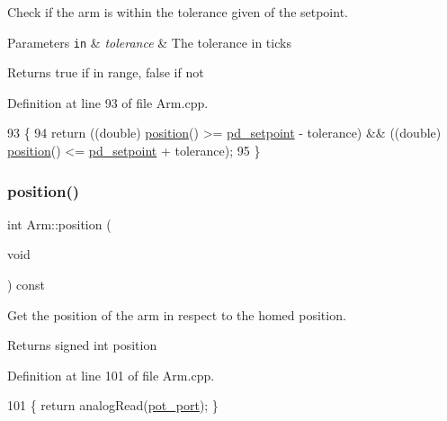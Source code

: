 Check if the arm is within the tolerance given of the setpoint. 


\begin{DoxyParams}[1]{Parameters}
\mbox{\tt in}  & {\em tolerance} & The tolerance in ticks \\
\hline
\end{DoxyParams}
\begin{DoxyReturn}{Returns}
true if in range, false if not 
\end{DoxyReturn}


Definition at line 93 of file Arm.\+cpp.


\begin{DoxyCode}
93                                        \{
94     \textcolor{keywordflow}{return} ((\textcolor{keywordtype}{double}) \hyperlink{class_arm_a2688295ef2029461e65723d1563f7a28}{position}() >= \hyperlink{class_arm_a1f4bd75360f1fa61330494569b08f4aa}{pd\_setpoint} - tolerance) && ((double) 
      \hyperlink{class_arm_a2688295ef2029461e65723d1563f7a28}{position}() <= \hyperlink{class_arm_a1f4bd75360f1fa61330494569b08f4aa}{pd\_setpoint} + tolerance);
95 \}
\end{DoxyCode}
\mbox{\label{class_arm_a2688295ef2029461e65723d1563f7a28}} 
\subsubsection{\texorpdfstring{position()}{position()}}
{\footnotesize\ttfamily int Arm\+::position (\begin{DoxyParamCaption}\item[{void}]{ }\end{DoxyParamCaption}) const}



Get the position of the arm in respect to the homed position. 

\begin{DoxyReturn}{Returns}
signed int position 
\end{DoxyReturn}


Definition at line 101 of file Arm.\+cpp.


\begin{DoxyCode}
101 \{ \textcolor{keywordflow}{return} analogRead(\hyperlink{class_arm_a6e384005fe53340f168ad5708302231a}{pot\_port}); \}
\end{DoxyCode}
\mbox{\label{class_arm_a8cd24cca4215a944bd47df13e252e8a0}} 
